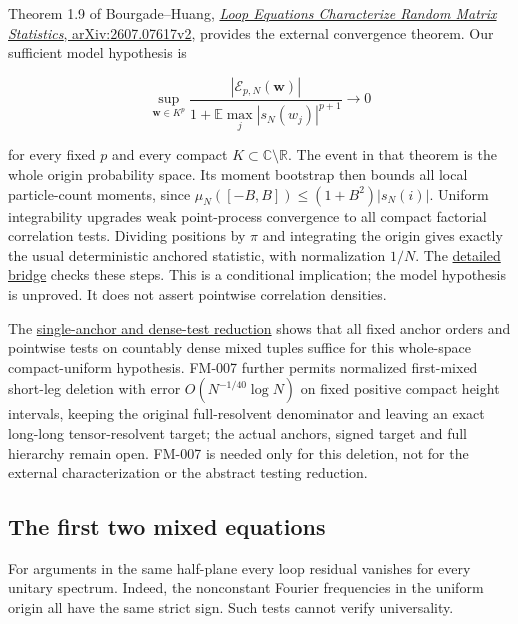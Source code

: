 Theorem 1.9 of Bourgade--Huang,
\href{https://arxiv.org/abs/2607.07617v2}{\emph{Loop Equations Characterize Random Matrix Statistics}, arXiv:2607.07617v2},
provides the external convergence theorem. Our sufficient model hypothesis is

\[
\sup_{\mathbf w\in K^p}
\frac{|\mathcal E_{p,N}(\mathbf w)|}
 {1+\mathbb E\max_j|s_N(w_j)|^{p+1}}\longrightarrow0
\]

for every fixed \(p\) and every compact \(K\subset\mathbb C\setminus\mathbb R\).
The event in that theorem is the whole origin probability space. Its moment
bootstrap then bounds all local particle-count moments, since
\(\mu_N([-B,B])\le(1+B^2)|s_N(i)|\). Uniform integrability upgrades weak
point-process convergence to all compact factorial correlation tests.
Dividing positions by \(\pi\) and integrating the origin gives exactly the
usual deterministic anchored statistic, with normalization \(1/N\).
The \href{https://github.com/ChurilovMaksim/BGS/blob/main/supplement/fixed_map/resolvent-flow/loop_bridge.md}{detailed bridge}
checks these steps. This is a conditional implication; the model hypothesis
is unproved. It does not assert pointwise correlation densities.

The \href{https://github.com/ChurilovMaksim/BGS/blob/main/supplement/fixed_map/resolvent-flow/loop_test_reductions.md}{single-anchor and dense-test reduction}
shows that all fixed anchor orders and pointwise tests on countably dense mixed
tuples suffice for this whole-space compact-uniform hypothesis. FM-007 further
permits normalized first-mixed short-leg deletion with error
\(O(N^{-1/40}\log N)\) on fixed positive compact height intervals, keeping the
original full-resolvent denominator and leaving an exact long-long
tensor-resolvent target; the actual anchors, signed target and full hierarchy
remain open. FM-007 is needed only for this deletion, not for the external
characterization or the abstract testing reduction.

\hypertarget{the-first-two-mixed-equations}{%
\subsection{The first two mixed equations}\label{the-first-two-mixed-equations}}

For arguments in the same half-plane every loop residual vanishes for
every unitary spectrum. Indeed, the nonconstant Fourier frequencies in the
uniform origin all have the same strict sign. Such tests cannot verify
universality.

